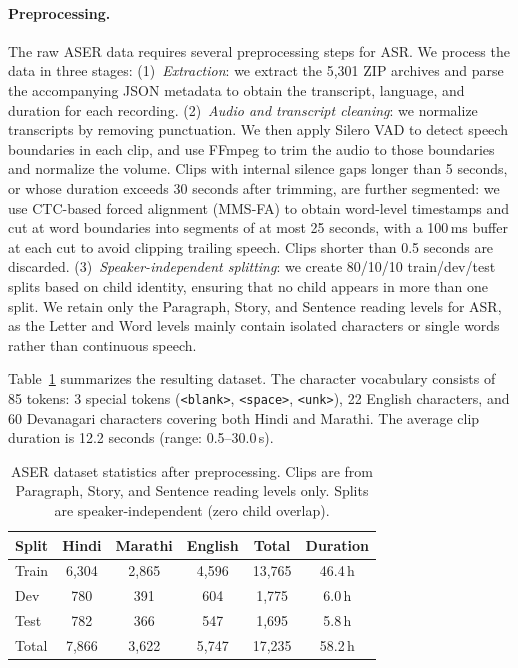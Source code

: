 \documentclass{article} %
\begin{document}
\paragraph{Preprocessing.} The raw ASER data requires several preprocessing steps for ASR. We process the data in three stages: (1)~\textit{Extraction}: we extract the 5,301 ZIP archives and parse the accompanying JSON metadata to obtain the transcript, language, and duration for each recording. (2)~\textit{Audio and transcript cleaning}: we normalize transcripts by removing punctuation. We then apply Silero VAD to detect speech boundaries in each clip, and use FFmpeg to trim the audio to those boundaries and normalize the volume. Clips with internal silence gaps longer than 5 seconds, or whose duration exceeds 30 seconds after trimming, are further segmented: we use CTC-based forced alignment (MMS-FA) to obtain word-level timestamps and cut at word boundaries into segments of at most 25 seconds, with a 100\,ms buffer at each cut to avoid clipping trailing speech. Clips shorter than 0.5 seconds are discarded. (3)~\textit{Speaker-independent splitting}: we create 80/10/10 train/dev/test splits based on child identity, ensuring that no child appears in more than one split. We retain only the Paragraph, Story, and Sentence reading levels for ASR, as the Letter and Word levels mainly contain isolated characters or single words rather than continuous speech.

Table~\ref{tab:dataset} summarizes the resulting dataset. The character vocabulary consists of 85 tokens: 3 special tokens (\texttt{<blank>}, \texttt{<space>}, \texttt{<unk>}), 22 English characters, and 60 Devanagari characters covering both Hindi and Marathi. The average clip duration is 12.2 seconds (range: 0.5--30.0\,s).

\FloatBarrier
\begin{table}[h!]
\caption{ASER dataset statistics after preprocessing. Clips are from Paragraph, Story, and Sentence reading levels only. Splits are speaker-independent (zero child overlap).}
\label{tab:dataset}
\begin{center}
\begin{tabular}{lccccc}
\toprule
\textbf{Split} & \textbf{Hindi} & \textbf{Marathi} & \textbf{English} & \textbf{Total} & \textbf{Duration} \\
\midrule
Train & 6{,}304 & 2{,}865 & 4{,}596 & 13{,}765 & 46.4\,h \\
Dev & 780 & 391 & 604 & 1{,}775 & 6.0\,h \\
Test & 782 & 366 & 547 & 1{,}695 & 5.8\,h \\
\midrule
Total & 7{,}866 & 3{,}622 & 5{,}747 & 17{,}235 & 58.2\,h \\
\bottomrule
\end{tabular}
\end{center}
\end{table}
\end{document}
